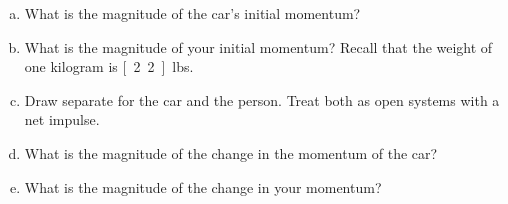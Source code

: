\label{fnt7.1.1-4}


\begin{enumerate}[(a)]
	\item What is the magnitude of the car's initial momentum?
	\item What is the magnitude of your initial momentum? Recall that the weight of one kilogram is \unit[2.2]{lbs}.
	\item Draw separate \pcharts{} for the car and the person. Treat both as open systems with a net impulse.
	\item What is the magnitude of the change in the momentum of the car?
	\item What is the magnitude of the change in your momentum?
\end{enumerate}